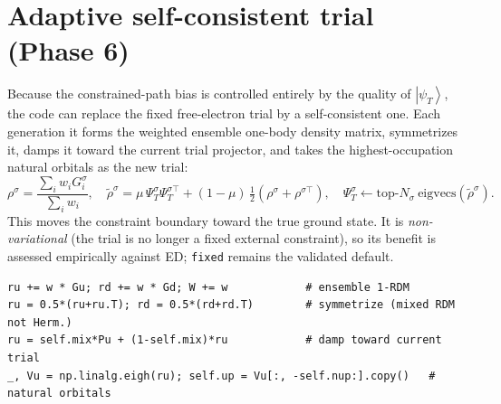 \documentclass[11pt]{article}
\newcommand{\ket}[1]{\left|#1\right\rangle}
\newcommand{\psiT}{\ket{\psi_T}}
\begin{document}
\section{Adaptive self-consistent trial (Phase 6)}
Because the constrained-path bias is controlled entirely by the quality of
$\psiT$, the code can replace the fixed free-electron trial by a
self-consistent one. Each generation it forms the weighted ensemble one-body
density matrix, symmetrizes it, damps it toward the current trial projector, and
takes the highest-occupation natural orbitals as the new trial:
\begin{equation}
\rho^{\sigma} = \frac{\sum_i w_i G^{\sigma}_i}{\sum_i w_i},\quad
\tilde\rho^{\sigma}= \mu\,\Psi_T^{\sigma}\Psi_T^{\sigma\top}
+(1-\mu)\,\tfrac12(\rho^{\sigma}+\rho^{\sigma\top}),\quad
\Psi_T^{\sigma}\leftarrow \text{top-}N_\sigma\ \text{eigvecs}(\tilde\rho^{\sigma}).
\label{eq:adapt}
\end{equation}
This moves the constraint boundary toward the true ground state. It is
\emph{non-variational} (the trial is no longer a fixed external constraint), so
its benefit is assessed empirically against ED; \texttt{fixed} remains the
validated default.

\begin{lstlisting}[caption={Natural-orbital self-consistent update
(\texttt{TrialWF.update}).}]
ru += w * Gu; rd += w * Gd; W += w            # ensemble 1-RDM
ru = 0.5*(ru+ru.T); rd = 0.5*(rd+rd.T)        # symmetrize (mixed RDM not Herm.)
ru = self.mix*Pu + (1-self.mix)*ru            # damp toward current trial
_, Vu = np.linalg.eigh(ru); self.up = Vu[:, -self.nup:].copy()   # natural orbitals
\end{lstlisting}
\end{document}

